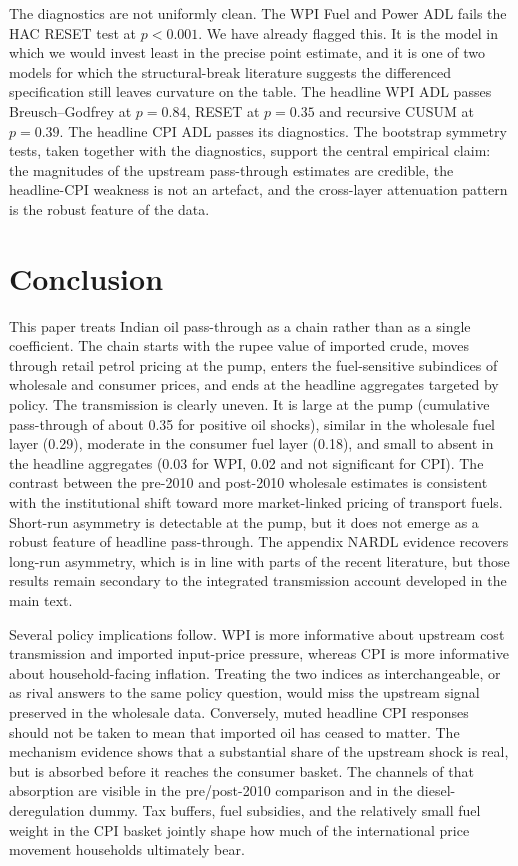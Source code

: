 \documentclass[11pt,a4paper]{article}
\begin{document}
The diagnostics are not uniformly clean. The WPI Fuel and Power ADL fails the HAC RESET test at $p < 0.001$. We have already flagged this. It is the model in which we would invest least in the precise point estimate, and it is one of two models for which the structural-break literature suggests the differenced specification still leaves curvature on the table. The headline WPI ADL passes Breusch--Godfrey at $p = 0.84$, RESET at $p = 0.35$ and recursive CUSUM at $p = 0.39$. The headline CPI ADL passes its diagnostics. The bootstrap symmetry tests, taken together with the diagnostics, support the central empirical claim: the magnitudes of the upstream pass-through estimates are credible, the headline-CPI weakness is not an artefact, and the cross-layer attenuation pattern is the robust feature of the data.

\section{Conclusion}
\label{sec:conc}

This paper treats Indian oil pass-through as a chain rather than as a single coefficient. The chain starts with the rupee value of imported crude, moves through retail petrol pricing at the pump, enters the fuel-sensitive subindices of wholesale and consumer prices, and ends at the headline aggregates targeted by policy. The transmission is clearly uneven. It is large at the pump (cumulative pass-through of about 0.35 for positive oil shocks), similar in the wholesale fuel layer (0.29), moderate in the consumer fuel layer (0.18), and small to absent in the headline aggregates (0.03 for WPI, 0.02 and not significant for CPI). The contrast between the pre-2010 and post-2010 wholesale estimates is consistent with the institutional shift toward more market-linked pricing of transport fuels. Short-run asymmetry is detectable at the pump, but it does not emerge as a robust feature of headline pass-through. The appendix NARDL evidence recovers long-run asymmetry, which is in line with parts of the recent literature, but those results remain secondary to the integrated transmission account developed in the main text.

Several policy implications follow. WPI is more informative about upstream cost transmission and imported input-price pressure, whereas CPI is more informative about household-facing inflation. Treating the two indices as interchangeable, or as rival answers to the same policy question, would miss the upstream signal preserved in the wholesale data. Conversely, muted headline CPI responses should not be taken to mean that imported oil has ceased to matter. The mechanism evidence shows that a substantial share of the upstream shock is real, but is absorbed before it reaches the consumer basket. The channels of that absorption are visible in the pre/post-2010 comparison and in the diesel-deregulation dummy. Tax buffers, fuel subsidies, and the relatively small fuel weight in the CPI basket jointly shape how much of the international price movement households ultimately bear.
\end{document}
